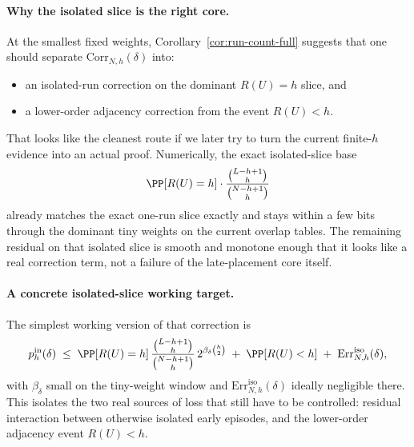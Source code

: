 \paragraph{Why the isolated slice is the right core.}
At the smallest fixed weights, Corollary~\ref{cor:run-count-full} suggests that one should separate
\(\mathrm{Corr}_{N,h}(\delta)\) into:
\begin{itemize}
\item an isolated-run correction on the dominant \(R(U)=h\) slice, and
\item a lower-order adjacency correction from the event \(R(U)<h\).
\end{itemize}
That looks like the cleanest route if we later try to turn the current finite-\(h\) evidence into an actual proof.
Numerically, the exact isolated-slice base
\[
\PP[R(U)=h]\cdot \frac{\binom{L-h+1}{h}}{\binom{N-h+1}{h}}
\]
already matches the exact one-run slice exactly and stays within a few bits through the dominant tiny weights on the
current overlap tables. The remaining residual on that isolated slice is smooth and monotone enough that it looks
like a real correction term, not a failure of the late-placement core itself.

\paragraph{A concrete isolated-slice working target.}
The simplest working version of that correction is
\begin{equation}
\label{eq:dense-dense-working-isolated-target}
p_h^{\mathrm{in}}(\delta)
\;\le\;
\PP[R(U)=h]\,
\frac{\binom{L-h+1}{h}}{\binom{N-h+1}{h}}\,
2^{\beta_\delta \binom{h}{2}}
\;+\;
\PP[R(U)<h]
\;+\;
\mathrm{Err}^{\mathrm{iso}}_{N,h}(\delta),
\end{equation}
with \(\beta_\delta\) small on the tiny-weight window and \(\mathrm{Err}^{\mathrm{iso}}_{N,h}(\delta)\) ideally negligible
there. This isolates the two real sources of loss that still have to be controlled: residual interaction between
otherwise isolated early episodes, and the lower-order adjacency event \(R(U)<h\).

